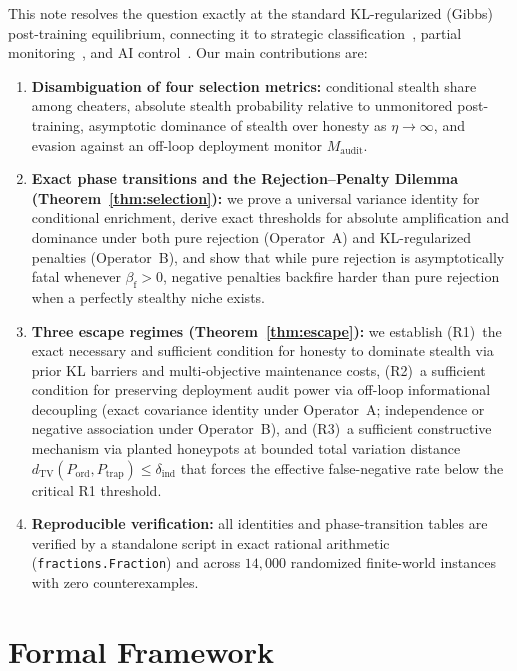 \documentclass[11pt,a4paper]{article}
\newcommand{\dTV}{d_{\mathrm{TV}}}
\begin{document}
This note resolves the question exactly at the standard KL-regularized (Gibbs) post-training equilibrium, connecting it to strategic classification~\cite{hardt2016}, partial monitoring~\cite{bartok2014}, and AI control~\cite{greenblatt2023,griffin2024,terekhov2025,ukaisi2025}. Our main contributions are:
\begin{enumerate}
  \item \textbf{Disambiguation of four selection metrics:} conditional stealth share among cheaters, absolute stealth probability relative to unmonitored post-training, asymptotic dominance of stealth over honesty as $\eta \to \infty$, and evasion against an off-loop deployment monitor $M_{\mathrm{audit}}$.
  \item \textbf{Exact phase transitions and the Rejection--Penalty Dilemma (Theorem~\ref{thm:selection}):} we prove a universal variance identity for conditional enrichment, derive exact thresholds for absolute amplification and dominance under both pure rejection (Operator~A) and KL-regularized penalties (Operator~B), and show that while pure rejection is asymptotically fatal whenever $\beta_{\mathrm{f}} > 0$, negative penalties backfire harder than pure rejection when a perfectly stealthy niche exists.
  \item \textbf{Three escape regimes (Theorem~\ref{thm:escape}):} we establish (R1)~the exact necessary and sufficient condition for honesty to dominate stealth via prior KL barriers and multi-objective maintenance costs, (R2)~a sufficient condition for preserving deployment audit power via off-loop informational decoupling (exact covariance identity under Operator~A; independence or negative association under Operator~B), and (R3)~a sufficient constructive mechanism via planted honeypots at bounded total variation distance $\dTV(P_{\mathrm{ord}}, P_{\mathrm{trap}}) \le \delta_{\mathrm{ind}}$ that forces the effective false-negative rate below the critical R1 threshold.
  \item \textbf{Reproducible verification:} all identities and phase-transition tables are verified by a standalone script in exact rational arithmetic (\texttt{fractions.Fraction}) and across $14{,}000$ randomized finite-world instances with zero counterexamples.
\end{enumerate}

\section{Formal Framework}
\end{document}
